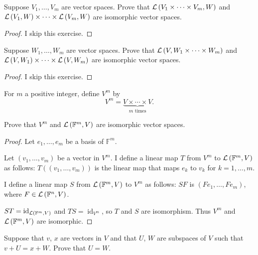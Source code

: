 \begin{exercise}
    Suppose $V_{1} , \ldots, V_{m}$ are vector spaces. Prove that $\mathcal{L}\left({V_{1} \times \cdots\times V_{m} , W}\right)$ and $\mathcal{L}\left({V_{1} , W}\right) \times \cdots \times \mathcal{L}\left({V_{m} , W}\right)$ are isomorphic vector spaces.
\end{exercise}

\begin{proof}
    I skip this exercise.
\end{proof}
\newpage

\begin{exercise}
    Suppose $W_{1} , \ldots, W_{m}$ are vector spaces. Prove that $\mathcal{L}\left({V, W_{1} \times \cdots \times W_{m}}\right)$ and $\mathcal{L}\left({V, W_{1}}\right) \times \cdots \times \mathcal{L}\left({V, W_{m}}\right)$ are isomorphic vector spaces.
\end{exercise}

\begin{proof}
    I skip this exercise.
\end{proof}
\newpage

\begin{exercise}
    For $m$ a positive integer, define $V^{m}$ by
    \[
        V^{m} = \underbrace{V\times \cdots \times V}_{\text{$m$ times}}.
    \]

    Prove that $V^{m}$ and $\mathcal{L}\left({\mathbb{F}^{m}, V}\right)$ are isomorphic vector spaces.
\end{exercise}

\begin{proof}
    Let $e_{1}, \ldots, e_{m}$ be a basis of $\mathbb{F}^{m}$.

    Let $(v_{1}, \ldots, v_{m})$ be a vector in $V^{m}$. I define a linear map $T$ from $V^{m}$ to $\mathcal{L}\left({\mathbb{F}^{m}, V}\right)$ as follows: $T((v_{1}, \ldots, v_{m}))$ is the linear map that maps $e_{k}$ to $v_{k}$ for $k = 1,\ldots, m$.

    I define a linear map $S$ from $\mathcal{L}\left({\mathbb{F}^{m}, V}\right)$ to $V^{m}$ as follows: $SF$ is $(Fe_{1}, \ldots, Fe_{m})$, where $F\in\mathcal{L}\left({\mathbb{F}^{n}, V}\right)$.

    $ST = \operatorname{id}_{\mathcal{L}\left({\mathbb{F}^{m}, V}\right)}$ and $TS = \operatorname{id}_{V^{m}}$, so $T$ and $S$ are isomorphism. Thus $V^{m}$ and $\mathcal{L}\left({\mathbb{F}^{m}, V}\right)$ are isomorphic.
\end{proof}
\newpage

\begin{exercise}
    Suppose that $v$, $x$ are vectors in $V$ and that $U$, $W$ are subspaces of $V$ such that $v + U = x + W$. Prove that $U = W$.
\end{exercise}


